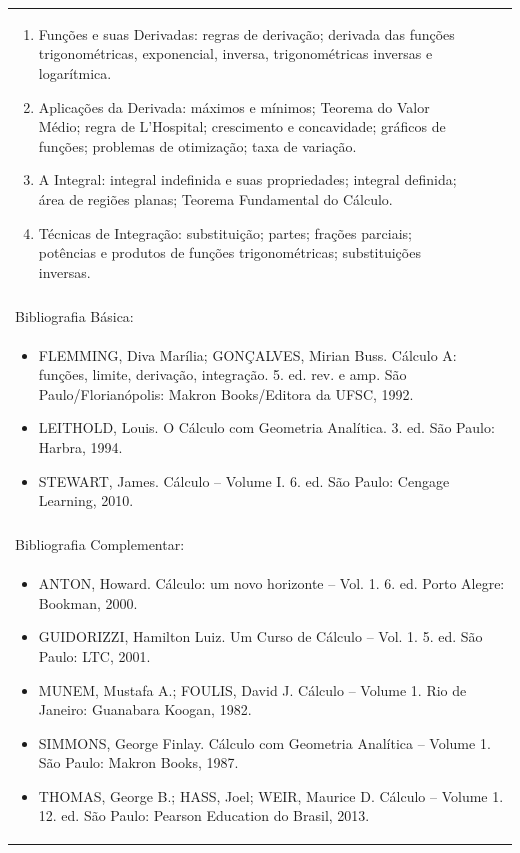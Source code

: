 \documentclass[11pt]{article}
\begin{document}
\begin{center}
\begin{longtable}{|p{4cm}|p{4cm}|p{4cm}|p{4cm}|}
{\begin{enumerate}
\item Funções e suas Derivadas: regras de derivação; derivada das funções trigonométricas, exponencial, inversa, trigonométricas inversas e logarítmica.
\item Aplicações da Derivada: máximos e mínimos; Teorema do Valor Médio; regra de L’Hospital; crescimento e concavidade; gráficos de funções; problemas de otimização; taxa de variação.
\item A Integral: integral indefinida e suas propriedades; integral definida; área de regiões planas; Teorema Fundamental do Cálculo.
\item Técnicas de Integração: substituição; partes; frações parciais; potências e produtos de funções trigonométricas; substituições inversas.\end{enumerate}}\\
\multicolumn{4}{|p{16cm}|}{}\\
\hline
\multicolumn{4}{|p{16cm}|}{Bibliografia Básica:}\\
\multicolumn{4}{|p{16cm}|}{%
\begin{itemize}\item FLEMMING, Diva Marília; GONÇALVES, Mirian Buss. Cálculo A: funções, limite, derivação, integração. 5. ed. rev. e amp. São Paulo/Florianópolis: Makron Books/Editora da UFSC, 1992.
\item LEITHOLD, Louis. O Cálculo com Geometria Analítica. 3. ed. São Paulo: Harbra, 1994.
\item STEWART, James. Cálculo – Volume I. 6. ed. São Paulo: Cengage Learning, 2010.\end{itemize}}\\
\multicolumn{4}{|p{16cm}|}{}\\
\hline
\multicolumn{4}{|p{16cm}|}{Bibliografia Complementar:}\\
\multicolumn{4}{|p{16cm}|}{%
\begin{itemize}\item ANTON, Howard. Cálculo: um novo horizonte – Vol. 1. 6. ed. Porto Alegre: Bookman, 2000.
\item GUIDORIZZI, Hamilton Luiz. Um Curso de Cálculo – Vol. 1. 5. ed. São Paulo: LTC, 2001.
\item MUNEM, Mustafa A.; FOULIS, David J. Cálculo – Volume 1. Rio de Janeiro: Guanabara Koogan, 1982.
\item SIMMONS, George Finlay. Cálculo com Geometria Analítica – Volume 1. São Paulo: Makron Books, 1987.
\item THOMAS, George B.; HASS, Joel; WEIR, Maurice D. Cálculo – Volume 1. 12. ed. São Paulo: Pearson Education do Brasil, 2013.\end{itemize}}\\
\hline
\end{longtable}
\end{center}
\end{document}
